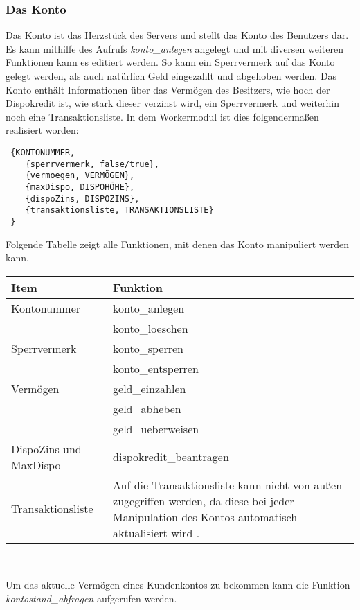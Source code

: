 \subsubsection{Das Konto}
Das Konto ist das Herzstück des Servers und stellt das Konto des Benutzers dar. Es kann mithilfe des Aufrufs \textit{konto\_anlegen} angelegt und mit diversen weiteren Funktionen kann es editiert werden. So kann ein Sperrvermerk auf das Konto gelegt werden, als auch natürlich Geld eingezahlt und abgehoben werden. Das Konto enthält Informationen über das Vermögen des Besitzers, wie hoch der Dispokredit ist, wie stark dieser verzinst wird, ein Sperrvermerk und weiterhin noch eine Transaktionsliste. In dem Workermodul ist dies folgendermaßen realisiert worden:
\begin{lstlisting}
 {KONTONUMMER, 
	{sperrvermerk, false/true},
 	{vermoegen, VERMÖGEN},
	{maxDispo, DISPOHÖHE},
	{dispoZins, DISPOZINS},
	{transaktionsliste, TRANSAKTIONSLISTE}
 }
\end{lstlisting}
Folgende Tabelle zeigt alle Funktionen, mit denen das Konto manipuliert werden kann.\\
\begin{center}
\begin{tabular}{p{5 cm}|p{9 cm}}
Item & Funktion \\
				\hline\hline
Kontonummer & konto\_anlegen \\
& konto\_loeschen \\
				\hline
Sperrvermerk & konto\_sperren \\
& konto\_entsperren \\
				\hline
Vermögen & geld\_einzahlen \\
& geld\_abheben \\
& geld\_ueberweisen\\
				\hline
DispoZins und MaxDispo & dispokredit\_beantragen \\
				\hline
Transaktionsliste & Auf die Transaktionsliste kann nicht von außen zugegriffen werden, da diese bei jeder Manipulation des Kontos automatisch aktualisiert wird .
\end{tabular}\\
\end{center}
Um das aktuelle Vermögen eines Kundenkontos zu bekommen kann die Funktion \textit{kontostand\_abfragen} aufgerufen werden. 
